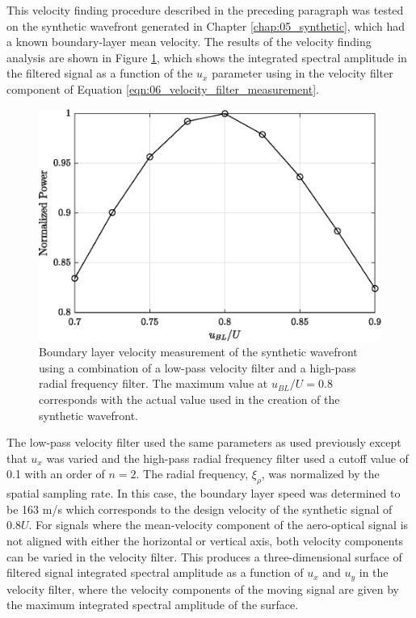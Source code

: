 This velocity finding procedure described in the preceding paragraph was tested on the synthetic wavefront generated in Chapter \ref{chap:05_synthetic}, which had a known boundary-layer mean velocity.
The results of the velocity finding analysis are shown in Figure \ref{fig:06_filter_velocity_measure}, which shows the integrated spectral amplitude in the filtered signal as a function of the $u_x$ parameter using in the velocity filter component of Equation \ref{eqn:06_velocity_filter_measurement}.
\begin{figure}
 \centering
 \includegraphics{../matlab/06_single_sensor_filtering/filter_velocity_measure.eps}
 \caption{Boundary layer velocity measurement of the synthetic wavefront using a combination of a low-pass velocity filter and a high-pass radial frequency filter. The maximum value at $u_{BL}/U=0.8$ corresponds with the actual value used in the creation of the synthetic wavefront.}
 \label{fig:06_filter_velocity_measure}
\end{figure}
The low-pass velocity filter used the same parameters as used previously except that $u_x$ was varied and the high-pass radial frequency filter used a cutoff value of 0.1 with an order of $n=2$.
The radial frequency, $\xi_\rho$, was normalized by the spatial sampling rate.
In this case, the boundary layer speed was determined to be 163 m/s which corresponds to the design velocity of the synthetic signal of $0.8U$.
For signals where the mean-velocity component of the aero-optical signal is not aligned with either the horizontal or vertical axis, both velocity components can be varied in the velocity filter.
This produces a three-dimensional surface of filtered signal integrated spectral amplitude as a function of $u_x$ and $u_y$ in the velocity filter, where the velocity components of the moving signal are given by the maximum integrated spectral amplitude of the surface.
